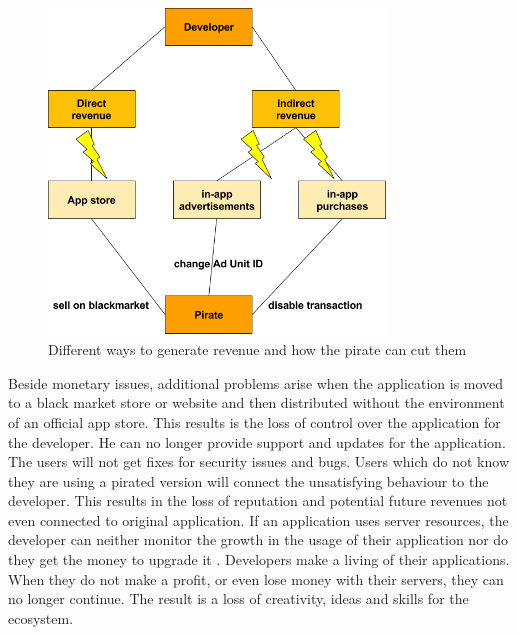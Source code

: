 \begin{figure}[h]
    \centering
    \includegraphics[width=0.8\textwidth]{data/revenue.png}
    \caption{Different ways to generate revenue and how the pirate can cut them}
    \label{fig:revenue}
\end{figure}
\newline
Beside monetary issues, additional problems arise when the application is moved to a black market store or website and then distributed without the environment of an official app store.
This results is the loss of control over the application for the developer.
He can no longer provide support and updates for the application.
The users will not get fixes for security issues and bugs.
Users which do not know they are using a pirated version will connect the unsatisfying behaviour to the developer.
This results in the loss of reputation and potential future revenues not even connected to original application.
\newline
If an application uses server resources, the developer can neither monitor the growth in the usage of their application nor do they get the money to upgrade it \cite{lierschDeveloperThreats}.
\newline
Developers make a living of their applications.
When they do not make a profit, or even lose money with their servers, they can no longer continue.
The result is a loss of creativity, ideas and skills for the ecosystem.
